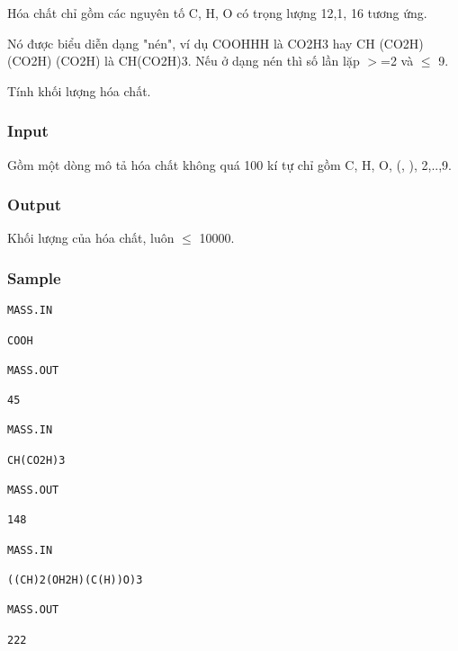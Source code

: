 



   Hóa chất chỉ gồm các nguyên tố C, H, O có trọng lượng 12,1, 16 tương ứng.  

   Nó được biểu diễn dạng "nén", ví dụ COOHHH là CO2H3  hay CH (CO2H) (CO2H) (CO2H) là CH(CO2H)3. Nếu ở dạng nén thì số lần lặp $>$=2 và  $\le$ 9.  

   Tính khối lượng hóa chất.  



\subsubsection{   Input  }



   Gồm một dòng mô tả hóa chất không quá 100 kí tự chỉ gồm C, H, O, (, ), 2,..,9.  



\subsubsection{   Output  }



   Khối lượng của hóa chất, luôn  $\le$ 10000.  



\subsubsection{   Sample  }
\begin{verbatim}
MASS.IN

COOH

MASS.OUT

45
 
MASS.IN

CH(CO2H)3

MASS.OUT

148
 
MASS.IN

((CH)2(OH2H)(C(H))O)3

MASS.OUT

222
 

\end{verbatim}
